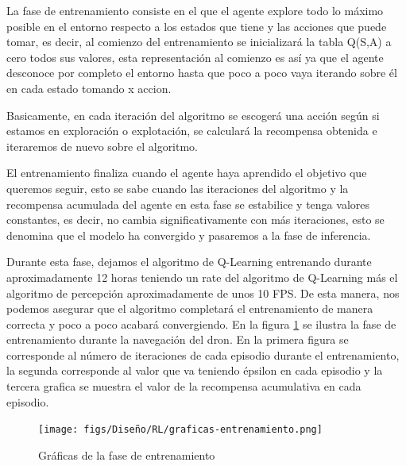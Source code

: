  
 La fase de entrenamiento consiste en el que el agente explore todo lo máximo posible en el entorno respecto a los estados que tiene y las acciones que puede tomar, es decir, al comienzo del entrenamiento se inicializará la tabla Q(S,A) a cero todos sus valores, esta representación
 al comienzo es así ya que el agente desconoce por completo el entorno hasta que poco a poco vaya iterando sobre él en cada estado tomando x accion. \newline
 
 Basicamente, en cada iteración del algoritmo se escogerá una acción según si estamos en exploración o explotación, se calculará la recompensa obtenida e iteraremos de nuevo sobre el algoritmo.

 El entrenamiento finaliza cuando el agente haya aprendido el objetivo que queremos seguir, esto se sabe cuando las iteraciones del algoritmo y la recompensa acumulada del agente en esta 
 fase se estabilice y tenga valores constantes, es decir, no cambia significativamente con más iteraciones, esto se denomina que el modelo ha convergido y pasaremos a la fase de inferencia. \newline

Durante esta fase, dejamos el algoritmo de Q-Learning entrenando durante aproximadamente 12 horas teniendo un rate del algoritmo de Q-Learning más el algoritmo de percepción aproximadamente de 
unos 10 FPS. De esta manera, nos podemos asegurar que el algoritmo completará el entrenamiento de manera correcta y poco a poco 
acabará convergiendo. 
En la figura \ref{fig:entrenamiento} se ilustra la fase de entrenamiento durante la navegación del dron. En la primera figura se corresponde al número de iteraciones de cada 
episodio durante el entrenamiento, la segunda corresponde al valor que va teniendo épsilon en cada episodio y la tercera grafica se muestra el valor de la recompensa 
acumulativa en cada episodio. \newline

\begin{figure} [H]
  \begin{center}
    \texttt{[image: figs/Diseño/RL/graficas-entrenamiento.png]}
  \end{center}
  \caption{Gráficas de la fase de entrenamiento}
  \label{fig:entrenamiento}
\end{figure}\


